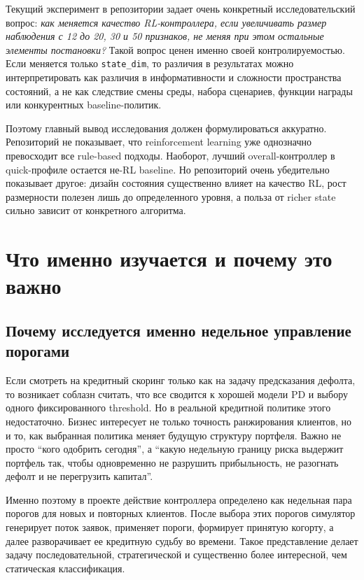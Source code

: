 \documentclass[12pt,a4paper]{article}
\begin{document}
Текущий эксперимент в репозитории задает очень конкретный исследовательский вопрос: \emph{как меняется качество RL-контроллера, если увеличивать размер наблюдения с 12 до 20, 30 и 50 признаков, не меняя при этом остальные элементы постановки?} Такой вопрос ценен именно своей контролируемостью. Если меняется только \texttt{state\_dim}, то различия в результатах можно интерпретировать как различия в информативности и сложности пространства состояний, а не как следствие смены среды, набора сценариев, функции награды или конкурентных baseline-политик.

Поэтому главный вывод исследования должен формулироваться аккуратно. Репозиторий не показывает, что reinforcement learning уже однозначно превосходит все rule-based подходы. Наоборот, лучший overall-контроллер в quick-профиле остается не-RL baseline. Но репозиторий очень убедительно показывает другое: дизайн состояния существенно влияет на качество RL, рост размерности полезен лишь до определенного уровня, а польза от richer state сильно зависит от конкретного алгоритма.

\section{Что именно изучается и почему это важно}

\subsection{Почему исследуется именно недельное управление порогами}

Если смотреть на кредитный скоринг только как на задачу предсказания дефолта, то возникает соблазн считать, что все сводится к хорошей модели PD и выбору одного фиксированного threshold. Но в реальной кредитной политике этого недостаточно. Бизнес интересует не только точность ранжирования клиентов, но и то, как выбранная политика меняет будущую структуру портфеля. Важно не просто ``кого одобрить сегодня'', а ``какую недельную границу риска выдержит портфель так, чтобы одновременно не разрушить прибыльность, не разогнать дефолт и не перегрузить капитал''.

Именно поэтому в проекте действие контроллера определено как недельная пара порогов для новых и повторных клиентов. После выбора этих порогов симулятор генерирует поток заявок, применяет пороги, формирует принятую когорту, а далее разворачивает ее кредитную судьбу во времени. Такое представление делает задачу последовательной, стратегической и существенно более интересной, чем статическая классификация.
\end{document}
